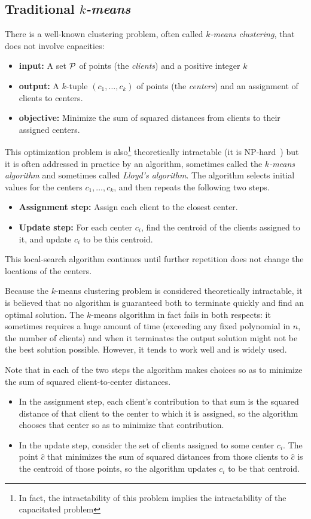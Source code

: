 \subsection{Traditional {\em $k$-means}}
There is a well-known clustering problem, often 
called {\em $k$-means clustering}, that does not involve capacities:
\begin{itemize}
\item {\bf input:} A set $\cal P$ of points (the
{\em clients}) and a positive integer $k$
\item {\bf output:} A $k$-tuple $(c_1, \ldots, c_k)$ of points
(the {\em centers}) and an assignment of clients to centers.
\item {\bf objective:} Minimize the sum of squared
distances from clients to their assigned centers.
\end{itemize}
This optimization problem is also\footnote{In fact, the intractability
  of this problem implies the intractability of the capacitated
  problem } theoretically intractable (it is NP-hard~\cite{***}) but 
it is often addressed in practice by an algorithm, sometimes
called the {\em $k$-means algorithm} and sometimes called {\em
  Lloyd's algorithm}.  The algorithm selects initial values for
the centers $c_1, \ldots, c_k$, and then repeats the following two
steps.
\begin{itemize}
\item {\bf Assignment step:} Assign each client to the closest center.
\item {\bf Update step:} For each center $c_i$, find the centroid of
  the clients assigned to it, and update $c_i$ to be this centroid.
\end{itemize}
This local-search algorithm continues until further repetition does
not change the locations of the centers.

Because the $k$-means clustering problem is considered theoretically
intractable, it is believed that no algorithm is guaranteed both to
terminate quickly and find an optimal solution.  The $k$-means
algorithm in fact fails in both respects: it sometimes requires a huge
amount of time (exceeding any fixed polynomial in $n$, the number of
clients) and when it terminates the output solution might not be the
best solution possible.  However, it tends to work well and is widely
used.

Note that in each of the two steps the algorithm makes choices so as
to minimize the sum of squared client-to-center distances.
\begin{itemize}
\item   In the
assignment step, each client's contribution to that sum is the
squared distance of that client to the center to which it is assigned,
so the algorithm chooses that center so as to minimize that
contribution.

\item In the update step, consider the set of clients assigned to some
  center $c_i$.  The point $\hat c$ that minimizes the sum of squared
  distances from those clients to $\hat c$ is the centroid of those
  points, so the algorithm updates $c_i$ to be that centroid.
\end{itemize}

